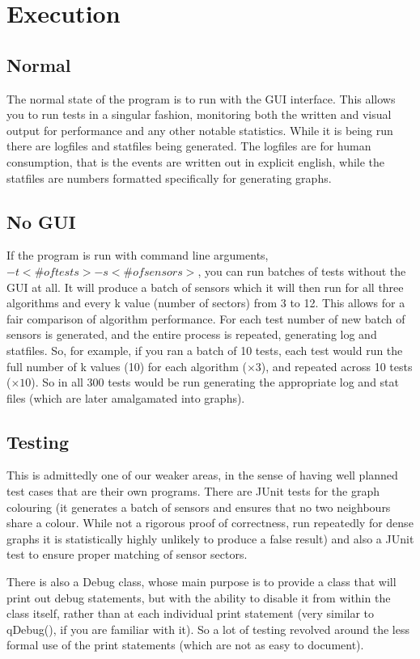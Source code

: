\section{Execution}

\subsection{Normal}
The normal state of the program is to run with the GUI interface. This allows you to run tests in a singular fashion, monitoring both the written and visual output for performance and any other notable statistics. While it is being run there are logfiles and statfiles being generated. The logfiles are for human consumption, that is the events are written out in explicit english, while the statfiles are numbers formatted specifically for generating graphs.

\subsection{No GUI}
If the program is run with command line arguments, $-t < \# of tests> -s <\# of sensors>$, you 
can run batches of tests without the GUI at all. It will produce a batch of sensors which it 
will then run for all three algorithms and every k value (number of sectors) from 3 to 12. 
This allows for a fair comparison of algorithm performance. For each test number of new batch 
of sensors is generated, and the entire process is repeated, generating log and statfiles. So, 
for example, if you ran a batch of 10 tests, each test would run the full number of k values 
(10) for each algorithm ($\times 3$), and repeated across 10 tests ($\times 10$). So in all 300 
tests would be run generating the appropriate log and stat files (which are later amalgamated 
into graphs).

\subsection{Testing}
This is admittedly one of our weaker areas, in the sense of having well planned test cases 
that are their own programs. There are JUnit tests for the graph colouring (it generates a 
batch of sensors and ensures that no two neighbours share a colour. While not a rigorous proof 
of correctness, run repeatedly for dense graphs it is statistically highly unlikely to produce 
a false result) and also a JUnit test to ensure proper matching of sensor sectors. 

There is also a Debug class, whose main purpose is to provide a class that will print out 
debug statements, but with the ability to disable it from within the class itself, rather than 
at each individual print statement (very similar to qDebug(), if you are familiar with it). So 
a lot of testing revolved around the less formal use of the print statements (which are not as 
easy to document).